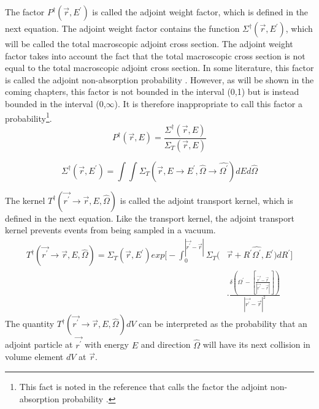 The factor $P^{\dagger}(\vec{r},E^{'})$ is called the adjoint weight factor, which
is defined in the next equation. The adjoint weight factor contains the 
function $\Sigma^{\dagger}(\vec{r},E^{'})$, which will be called the total
macroscopic adjoint cross section. The adjoint weight factor takes into account 
the fact that the total macroscopic cross section is not equal to the total 
macroscopic adjoint cross section. In some literature, this factor is called 
the adjoint non-absorption probability \citep{gabler_amos_2006}. However, as 
will be shown in the coming chapters, this factor is not bounded in the 
interval (0,1) but is instead bounded in the interval (0,$\infty$). It is 
therefore inappropriate to call this factor a probability\footnote{This fact is
noted in the reference that calls the factor the adjoint non-absorption 
probability \citep{gabler_amos_2006}.}.
\begin{equation}
  P^{\dagger}(\vec{r},E) = \frac{\Sigma^{\dagger}(\vec{r},E)}
  {\Sigma_T(\vec{r},E)}
\end{equation}

\begin{equation}
  \Sigma^{\dagger}(\vec{r},E^{'}) = \int\int 
  \Sigma_T(\vec{r},E \to E^{'},\hat{\Omega} \to \hat{\Omega^{'}}) dEd\hat{\Omega}
  \label{eq:total_adjoint_cross_section}
\end{equation}

The kernel $T^{\dagger}(\vec{r^{'}} \to \vec{r},E,\hat{\Omega})$ is called
the adjoint transport kernel, which is defined in the next equation. Like the
transport kernel, the adjoint transport kernel prevents events from being
sampled in a vacuum.
\begin{equation}
  \begin{split}
  T^{\dagger}(\vec{r^{'}} \to \vec{r},E,\hat{\Omega}) = 
  \Sigma_T(\vec{r},E^{'}) exp\Big[-\int_0^{|\vec{r^{'}} - \vec{r}|} 
      \Sigma_T(&\vec{r}+R^{'}\hat{\Omega^{'}},E^{'})dR^{'} \Big] \\
    & \cdot \frac{\delta \left(\Omega^{'} - \left[\frac{\vec{r^{'}} - \vec{r}}
        {|\vec{r^{'}} - \vec{r}|}\right]\right)}
    {|\vec{r^{'}} - \vec{r}|^2}
  \end{split}
\end{equation}
The quantity $T^{\dagger}(\vec{r^{'}} \to \vec{r},E,\hat{\Omega})dV$ can be
interpreted as the probability that an adjoint particle at $\vec{r^{'}}$ with
energy $E$ and direction $\hat{\Omega}$ will have its next collision in volume
element $dV$ at $\vec{r}$.

